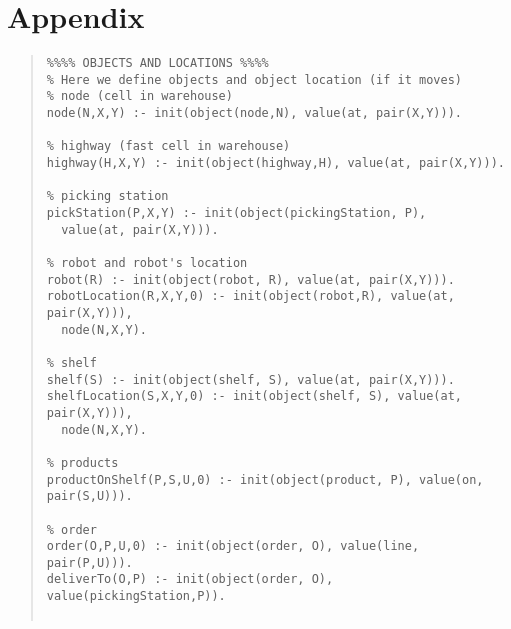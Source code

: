 \documentclass[letterpaper]{article} %
\begin{document}
\section{Appendix} \label{sec:appendix}
\begin{quote}
\begin{scriptsize}\begin{verbatim}
%%%% OBJECTS AND LOCATIONS %%%%
% Here we define objects and object location (if it moves)                                                                                                                                                                                                                                                                    % node (cell in warehouse)
node(N,X,Y) :- init(object(node,N), value(at, pair(X,Y))).                                                                                                                                                                                                                                                                    

% highway (fast cell in warehouse)
highway(H,X,Y) :- init(object(highway,H), value(at, pair(X,Y))).                                                                                                                                                                                                                                                              

% picking station
pickStation(P,X,Y) :- init(object(pickingStation, P), 
  value(at, pair(X,Y))).                                                                                                                                                                                                                                                  

% robot and robot's location
robot(R) :- init(object(robot, R), value(at, pair(X,Y))). 
robotLocation(R,X,Y,0) :- init(object(robot,R), value(at, pair(X,Y))), 
  node(N,X,Y). 

% shelf
shelf(S) :- init(object(shelf, S), value(at, pair(X,Y))).
shelfLocation(S,X,Y,0) :- init(object(shelf, S), value(at, pair(X,Y))), 
  node(N,X,Y).    
                                                                                                                                             
% products
productOnShelf(P,S,U,0) :- init(object(product, P), value(on, pair(S,U))).

% order
order(O,P,U,0) :- init(object(order, O), value(line, pair(P,U))).
deliverTo(O,P) :- init(object(order, O), value(pickingStation,P)).


\end{verbatim}
\end{scriptsize}
\end{quote}
\end{document}
